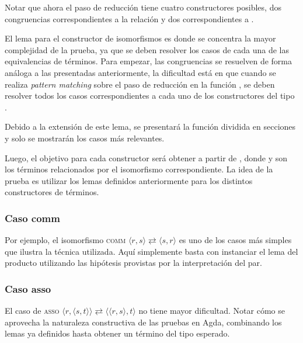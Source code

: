 
Notar que ahora el paso de reducción tiene cuatro constructores posibles, dos congruencias correspondientes a la relación \type{$\hookrightarrow$} y dos correspondientes a \type{$\rightleftarrows$}.

El lema para el constructor de isomorfismos es donde se concentra la mayor complejidad de la prueba, ya que se deben resolver los casos de cada una de las equivalencias de términos.
Para empezar, las congruencias se resuelven de forma análoga a las presentadas anteriormente, la dificultad está en que cuando se realiza \textit{pattern matching} sobre el paso de reducción en la función , se deben resolver todos los casos correspondientes a cada uno de los constructores del tipo .

Debido a la extensión de este lema, se presentará la función  dividida en secciones y solo se mostrarán los casos más relevantes.


Luego, el objetivo para cada constructor será obtener \snstar{} a partir de \snstar{}, donde  y  son los términos relacionados por el isomorfismo correspondiente.
La idea de la prueba es utilizar los lemas definidos anteriormente para los distintos constructores de términos.

\subsubsection{Caso comm}

Por ejemplo, el isomorfismo \textsc{comm} $\langle r,s \rangle \rightleftarrows \langle s,r \rangle$ es uno de los casos más simples que ilustra la técnica utilizada.
Aquí simplemente basta con instanciar el lema del producto utilizando las hipótesis provistas por la interpretación del par.


\subsubsection{Caso asso}

El caso de \textsc{asso} $\langle r, \langle s,t \rangle \rangle \rightleftarrows \langle \langle r, s \rangle, t \rangle$ no tiene mayor dificultad.
Notar cómo se aprovecha la naturaleza constructiva de las pruebas en Agda, combinando los lemas ya definidos hasta obtener un término del tipo esperado.

